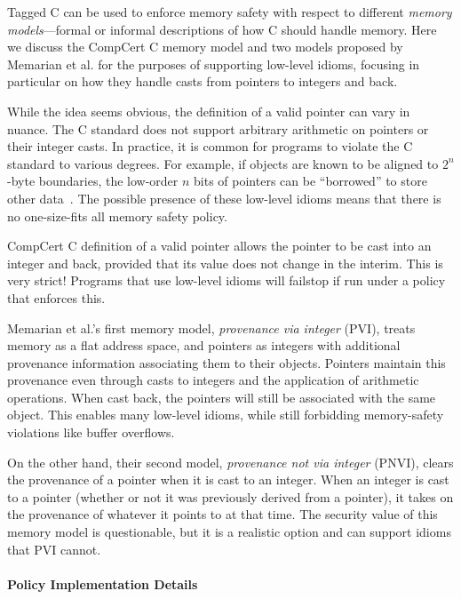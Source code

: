 \documentclass{llncs}
\begin{document}
Tagged C can be used to enforce memory safety with respect to different {\em memory models}---formal
or informal descriptions of how C should handle memory. Here we discuss the CompCert C
memory model and two models proposed by Memarian et al. \cite{Memarian19:ExploringCSemantics}
for the purposes of supporting low-level idioms, focusing in particular on how they handle
casts from pointers to integers and back.


While the idea seems obvious, the definition of a valid pointer can vary in nuance. The C standard
does not support arbitrary arithmetic on pointers or their integer casts.  In practice, it is common for programs to violate the
C standard to various degrees. For example, if objects are known to be aligned to \(2^n\)-byte boundaries,
the low-order \(n\) bits of pointers can be ``borrowed'' to store other data~\cite{Memarian16:DeFacto}.
The possible presence of these low-level idioms means that there is no one-size-fits all memory safety policy.


CompCert C definition of a valid pointer allows the pointer to be cast into an integer and back, provided that its value
does not change in the interim. This is very strict! Programs that use low-level idioms
will failstop if run under a policy that enforces this.

Memarian et al.'s first memory model, {\em provenance via integer} (PVI), treats memory
as a flat address space, and pointers as integers with additional provenance information
associating them to their objects. Pointers maintain this provenance even through casts to
integers and the application of arithmetic operations. When cast back, the pointers will still
be associated with the same object. This enables many low-level idioms, while still forbidding
memory-safety violations like buffer overflows.

On the other hand, their second model, {\em provenance not via integer} (PNVI), clears the
provenance of a pointer when it is cast to an integer. When an integer is cast to a pointer
(whether or not it was previously derived from a pointer), it takes on the provenance of whatever
it points to at that time. The security value of this memory model is questionable, but
it is a realistic option and can support idioms that PVI cannot.

\paragraph*{Policy Implementation Details}
\end{document}
